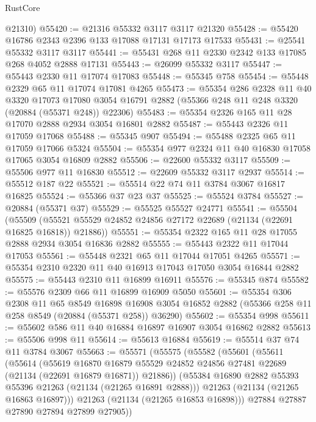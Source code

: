 \begin{lexlean}{RustCore}
\begin{coremodule}
      @21310)
@55420 := @21316 @55332 @3117 @3117 @21320
@55428 := @55420 @16786 @2343 @2396 @133 @17088 @17131 @17173 @17533
@55431 := @25541 @55332 @3117 @3117
@55441 := @55431 @268 @11 @2330 @2342 @133 @17085 @268 @4052 @2888 @17131
@55443 := @26099 @55332 @3117
@55447 := @55443 @2330 @11 @17074 @17083
@55448 := @55345 @758
@55454 := @55448 @2329 @65 @11 @17074 @17081 @4265
@55473 := @55354
    @286
    @2328
    @11
    @40
    @3320
    @17073
    @17080
    @3054
    @16791
    @2882
    (@55366 @248 @11 @248 @3320 (@20884 (@55371 @248)) @22306)
@55483 := @55354 @2326 @165 @11 @28 @17070 @2888 @2934 @3054 @16801 @2882
@55487 := @55443 @2326 @11 @17059 @17068
@55488 := @55345 @907
@55494 := @55488 @2325 @65 @11 @17059 @17066 @5324
@55504 := @55354 @977 @2324 @11 @40 @16830 @17058 @17065 @3054 @16809 @2882
@55506 := @22600 @55332 @3117
@55509 := @55506 @977 @11 @16830
@55512 := @22609 @55332 @3117 @2937
@55514 := @55512 @187 @22
@55521 := @55514 @22 @74 @11 @3784 @3067 @16817 @16825
@55524 := @55366 @37 @23 @37
@55525 := @55524 @3784
@55527 := @20884 (@55371 @37)
@55529 := @55525 @55527 @24771
@55541 := @55504
    (@55509 (@55521 @55529 @24852 @24856 @27172 @22689 (@21134 (@22691 @16825 @16818)) @21886))
@55551 := @55354 @2322 @165 @11 @28 @17055 @2888 @2934 @3054 @16836 @2882
@55555 := @55443 @2322 @11 @17044 @17053
@55561 := @55448 @2321 @65 @11 @17044 @17051 @4265
@55571 := @55354 @2310 @2320 @11 @40 @16913 @17043 @17050 @3054 @16844 @2882
@55575 := @55443 @2310 @11 @16899 @16911
@55576 := @55345 @874
@55582 := @55576 @2309 @66 @11 @16899 @16909 @5050
@55601 := @55354
    @306
    @2308
    @11
    @65
    @8549
    @16898
    @16908
    @3054
    @16852
    @2882
    (@55366 @258 @11 @258 @8549 (@20884 (@55371 @258)) @36290)
@55602 := @55354 @998
@55611 := @55602 @586 @11 @40 @16884 @16897 @16907 @3054 @16862 @2882
@55613 := @55506 @998 @11
@55614 := @55613 @16884
@55619 := @55514 @37 @74 @11 @3784 @3067
@55663 := @55571
    (@55575
      (@55582
        (@55601
          (@55611
            (@55614
              (@55619
                @16870
                @16879
                @55529
                @24852
                @24856
                @27481
                @22689
                (@21134 (@22691 @16879 @16871))
                @21886))
            (@55384 @16890 @2882 @55393 @55396 @21263 (@21134 (@21265 @16891 @2888)))
            @21263
            (@21134 (@21265 @16863 @16897)))
          @21263
          (@21134 (@21265 @16853 @16898)))
        @27884
        @27887
        @27890
        @27894
        @27899
        @27905))

\end{coremodule}
\end{lexlean}
